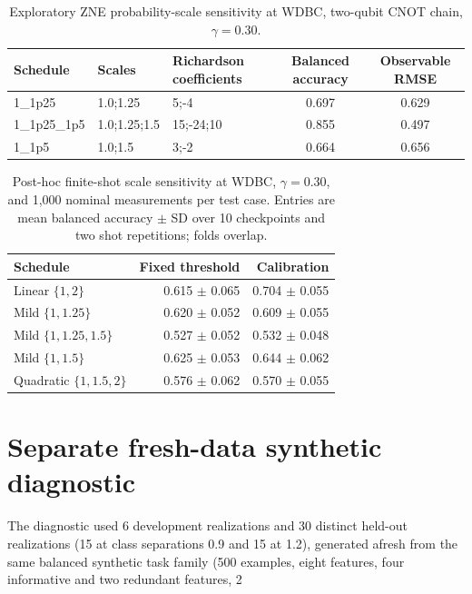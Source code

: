 \documentclass[10pt]{article}
\begin{document}
\begin{table}[t]\centering\scriptsize
\caption{Exploratory ZNE probability-scale sensitivity at WDBC, two-qubit CNOT chain, $\gamma=0.30$.}
\label{tab:scales}
\begin{tabular}{@{}l l l c c@{}}\toprule
Schedule & Scales & Richardson coefficients & Balanced accuracy & Observable RMSE \\
\midrule
1\_1p25 & 1.0;1.25 & 5;-4 & 0.697 & 0.629 \\
1\_1p25\_1p5 & 1.0;1.25;1.5 & 15;-24;10 & 0.855 & 0.497 \\
1\_1p5 & 1.0;1.5 & 3;-2 & 0.664 & 0.656 \\
\bottomrule\end{tabular}\end{table}

\begin{table}[t]\centering\small
\caption{Post-hoc finite-shot scale sensitivity at WDBC, $\gamma=0.30$, and 1,000 nominal measurements per test case. Entries are mean balanced accuracy $\pm$ SD over 10 checkpoints and two shot repetitions; folds overlap.}
\label{tab:finite-scales}
\begin{tabular}{@{}l r r@{}}\toprule
Schedule & Fixed threshold & Calibration \\
\midrule
Linear $\{1,2\}$ & 0.615 $\pm$ 0.065 & 0.704 $\pm$ 0.055 \\
Mild $\{1,1.25\}$ & 0.620 $\pm$ 0.052 & 0.609 $\pm$ 0.055 \\
Mild $\{1,1.25,1.5\}$ & 0.527 $\pm$ 0.052 & 0.532 $\pm$ 0.048 \\
Mild $\{1,1.5\}$ & 0.625 $\pm$ 0.053 & 0.644 $\pm$ 0.062 \\
Quadratic $\{1,1.5,2\}$ & 0.576 $\pm$ 0.062 & 0.570 $\pm$ 0.055 \\
\bottomrule\end{tabular}\end{table}

\clearpage
\section*{Separate fresh-data synthetic diagnostic}

The diagnostic used 6 development realizations and 30 distinct held-out realizations (15 at class separations 0.9 and 15 at 1.2), generated afresh from the same balanced synthetic task family (500 examples, eight features, four informative and two redundant features, 2%
\end{document}
